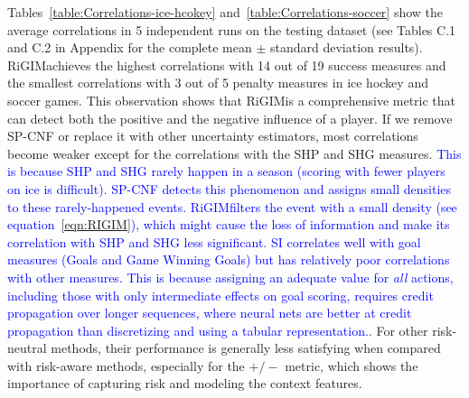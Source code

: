 \documentclass{article}
\newcommand{\sys}{RiGIM}
\newcommand{\system}{\sys\;}
\begin{document}
Tables~\ref{table:Correlations-ice-hcokey} and~\ref{table:Correlations-soccer} show the average correlations in 5 independent runs on the testing dataset (see Tables C.1 and C.2 in Appendix for the complete mean $\pm$ standard deviation results). \system achieves the highest correlations with 14 out of 19 success measures and the smallest correlations with 3 out of 5 penalty measures in ice hockey and soccer games. This observation shows that \system is a comprehensive metric that can detect both the positive and the negative influence of a player. If we remove SP-CNF or replace it with other uncertainty estimators, most correlations become weaker except for the correlations with the SHP and SHG measures. \textcolor{blue}{This is because SHP and SHG rarely happen in a season (scoring with fewer players on ice is difficult). SP-CNF detects this phenomenon and assigns small densities to these rarely-happened events. \system filters the event with a small density (see equation~\ref{eqn:RIGIM}), which might cause the loss of information and make its correlation with SHP and SHG less significant.} 
\textcolor{blue}{SI correlates well with goal measures (Goals and Game Winning Goals) but has relatively poor correlations with other measures. This is because assigning an adequate value for {\em all} actions, including those with only intermediate effects on goal scoring, requires credit propagation over longer sequences, where neural nets are better at credit propagation than discretizing and using a tabular representation.}.
For other risk-neutral methods, their performance is generally less satisfying when compared with risk-aware methods, especially for the $+/-$ metric, which shows the importance of capturing risk and modeling the context features.
\end{document}

